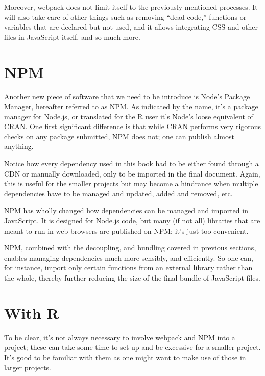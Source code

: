 \documentclass[10pt,]{krantz}
\begin{document}
Moreover, webpack does not limit itself to the previously-mentioned processes. It will also take care of other things such as removing ``dead code,'' functions or variables that are declared but not used, and it allows integrating CSS and other files in JavaScript itself, and so much more.

\hypertarget{webpack-npm}{%
\section{NPM}\label{webpack-npm}}

Another new piece of software that we need to be introduce is Node's Package Manager, hereafter referred to as NPM. As indicated by the name, it's a package manager for Node.js, or translated for the R user it's Node's loose equivalent of CRAN. One first significant difference is that while CRAN performs very rigorous checks on any package submitted, NPM does not; one can publish almost anything.

Notice how every dependency used in this book had to be either found through a CDN or manually downloaded, only to be imported in the final document. Again, this is useful for the smaller projects but may become a hindrance when multiple dependencies have to be managed and updated, added and removed, etc.

NPM has wholly changed how dependencies can be managed and imported in JavaScript. It is designed for Node.js code, but many (if not all) libraries that are meant to run in web browsers are published on NPM: it's just too convenient.

NPM, combined with the decoupling, and bundling covered in previous sections, enables managing dependencies much more sensibly, and efficiently. So one can, for instance, import only certain functions from an external library rather than the whole, thereby further reducing the size of the final bundle of JavaScript files.

\hypertarget{webpack-conclude}{%
\section{With R}\label{webpack-conclude}}

To be clear, it's not always necessary to involve webpack and NPM into a project; these can take some time to set up and be excessive for a smaller project. It's good to be familiar with them as one might want to make use of those in larger projects.
\end{document}
